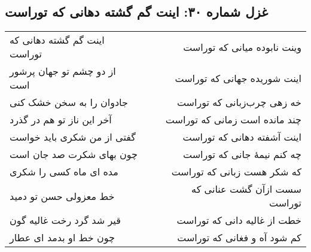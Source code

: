 \begin{center}
\section*{غزل شماره ۳۰: اینت گم گشته دهانی که توراست}
\label{sec:030}
\begin{longtable}{l p{0.5cm} r}
اینت گم گشته دهانی که توراست
&&
وینت نابوده میانی که توراست
\\
از دو چشم تو جهان پرشور است
&&
اینت شوریده جهانی که توراست
\\
جادوان را به سخن خشک کنی
&&
خه زهی چرب‌زبانی که توراست
\\
آخر این ناز تو هم در گذرد
&&
چند مانده است زمانی که توراست
\\
گفتی از من شکری باید خواست
&&
اینت آشفته دهانی که توراست
\\
چون بهای شکرت صد جان است
&&
چه کنم نیمهٔ جانی که توراست
\\
مده ای ماه کسی را شکری
&&
که شکر هست زبانی که توراست
\\
خط معزولی حسن تو دمید
&&
سست ازآن گشت عنانی که توراست
\\
قیر شد گرد رخت غالیه گون
&&
خطت از غالیه دانی که توراست
\\
چون خط او بدمد ای عطار
&&
کم شود آه و فغانی که توراست
\\
\end{longtable}
\end{center}
